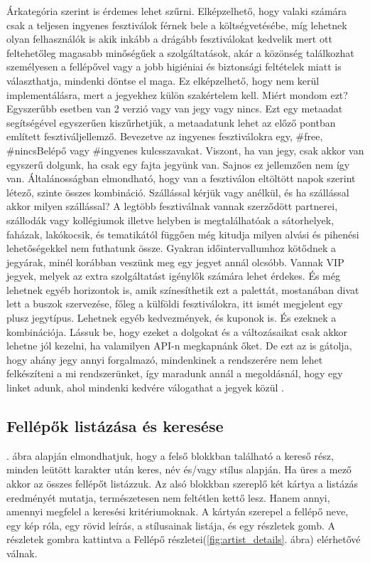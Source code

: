 Árkategória szerint is érdemes lehet szűrni. Elképzelhető, hogy valaki számára csak a teljesen ingyenes fesztiválok férnek bele a költségvetésébe, míg lehetnek olyan felhasználók is akik inkább a drágább fesztiválokat kedvelik mert ott feltehetőleg magasabb minőségűek a szolgáltatások, akár a közönség találkozhat személyesen a fellépővel vagy a jobb higiéniai és biztonsági feltételek miatt is választhatja, mindenki döntse el maga. Ez elképzelhető, hogy nem kerül implementálásra, mert a jegyekhez külön szakértelem kell. Miért mondom ezt? Egyszerűbb esetben van 2 verzió vagy van jegy vagy nincs. Ezt egy metaadat segítségével egyszerűen kiszűrhetjük, a metaadatunk lehet az előző pontban említett fesztiváljellemző. Bevezetve az ingyenes fesztiválokra egy, \#free, \#nincsBelépő vagy \#ingyenes kulcsszavakat. Viszont, ha van jegy, csak akkor van egyszerű dolgunk, ha csak egy fajta jegyünk van. Sajnos ez jellemzően nem így van. Általánosságban elmondható, hogy van a fesztiválon eltöltött napok szerint létező, szinte összes kombináció. Szállással kérjük vagy anélkül, és ha szállással akkor milyen szállással? A legtöbb fesztiválnak vannak szerződött partnerei, szállodák vagy kollégiumok illetve helyben is megtalálhatóak a sátorhelyek, faházak, lakókocsik, és tematikától függően még kitudja milyen alvási és pihenési lehetőségekkel nem futhatunk össze. Gyakran időintervallumhoz kötődnek a jegyárak, minél korábban veszünk meg egy jegyet annál olcsóbb. Vannak VIP jegyek, melyek az extra szolgáltatást igénylők számára lehet érdekes. És még lehetnek egyéb horizontok is, amik színesíthetik ezt a palettát, mostanában divat lett a buszok szervezése, főleg a  külföldi fesztiválokra, itt ismét megjelent egy plusz jegytípus. Lehetnek egyéb kedvezmények, és kuponok is. És ezeknek a kombinációja. Lássuk be, hogy ezeket a dolgokat és a változásaikat csak akkor lehetne jól kezelni, ha valamilyen API-n megkapnánk őket. De ezt az is gátolja, hogy ahány jegy annyi forgalmazó, mindenkinek a rendszerére nem lehet felkészíteni a mi rendszerünket, így maradunk annál a megoldásnál, hogy egy linket adunk, ahol mindenki kedvére válogathat a jegyek közül \cite{22}.

\subsection{Fellépők listázása és keresése}

. ábra alapján elmondhatjuk, hogy a felső blokkban található a kereső rész, minden leütött karakter után keres, név és/vagy stílus alapján. Ha üres a mező akkor az összes fellépőt listázzuk. Az alsó blokkban szereplő két kártya a listázás eredményét mutatja, természetesen nem feltétlen kettő lesz. Hanem annyi, amennyi megfelel a keresési kritériumoknak. A kártyán szerepel a fellépő neve, egy kép róla, egy rövid leírás, a stílusainak listája, és egy részletek gomb. A részletek gombra kattintva a Fellépő részletei(\ref{fig:artist_details}. ábra) elérhetővé válnak.

